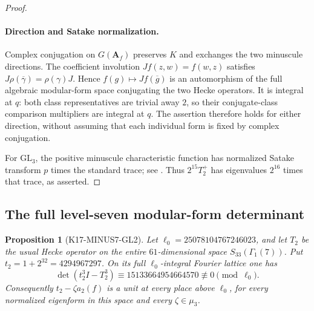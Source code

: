 \documentclass[11pt,a4paper]{article}
\newtheorem{proposition}[theorem]{Proposition}
\theoremstyle{definition}
\begin{document}
\begin{proof}
\paragraph{Direction and Satake normalization.}
Complex conjugation on $G(\mathbf A_f)$ preserves $K$ and exchanges
the two minuscule directions. The coefficient involution
$Jf(z,w)=f(w,z)$ satisfies
$J\rho(\overline\gamma)=\rho(\gamma)J$.
Hence $f(g)\mapsto J f(\overline g)$ is an automorphism of the
full algebraic modular-form space conjugating the two Hecke
operators. It is integral at $q$: both class representatives are
trivial away $2$, so their conjugate-class comparison multipliers
are integral at $q$. The assertion therefore holds for either
direction, without assuming that each individual form is fixed
by complex conjugation.

For $\mathrm{GL}_3$, the positive minuscule characteristic function
has normalized Satake transform $p$ times the standard trace;
see \cite[\S3, (3.13)--(3.14)]{K17GrossSatake1998}.
Thus $2^{15}T_2^+$ has eigenvalues $2^{16}$ times that trace,
as asserted.
\end{proof}

\subsection{The full level-seven modular-form determinant}
\label{sec:gl2-minus7}

\begin{proposition}[K17-MINUS7-GL2]\label{prop:minus7-gl2}
Let \(\ell_0=25078104767246023\), and let \(T_2\) be the usual
Hecke operator on the entire \(61\)-dimensional space
\(S_{33}(\Gamma_1(7))\). Put \(t_2=1+2^{32}=4294967297\).
On its full \(\ell_0\)-integral Fourier lattice one has
\[
 \det(t_2^3I-T_2^3)
    \equiv15133664954664570\not\equiv0\pmod{\ell_0}.
 \tag{G7.1}
\]
Consequently \(t_2-\zeta a_2(f)\) is a unit at every place above
\(\ell_0\), for every normalized eigenform in this space and every
\(\zeta\in\mu_3\).
\end{proposition}
\end{document}

